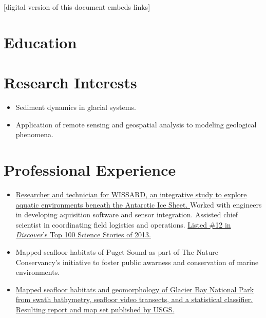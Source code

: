\documentclass{cv_TOH}
\begin{document}
\vspace{-0.2cm}
\centerline{\footnotesize{[digital version of this document embeds links]}}

\section{Education}

\section{Research Interests}
\begin{itemize}
\item Sediment dynamics in glacial systems.
\item Application of remote sensing and geospatial analysis to modeling geological phenomena.
\end{itemize}

\section{Professional Experience}

\begin{itemize}
\item \href{http://www.wissard.org}{Researcher and technician for WISSARD, an integrative study to explore aquatic environments beneath the Antarctic Ice Sheet. }Worked with engineers in developing aquisition software and sensor integration. Assisted chief scientist in coordinating field logistics and operations. \href{http://discovermagazine.com/2014/jan-feb/12-the-search-for-life-trapped-under-ice}{Listed \#12 in \textit{Discover}'s Top 100 Science Stories of 2013.}
\item Mapped seafloor habitats of Puget Sound as part of The Nature Conservancy's initiative to foster public awarness and conservation of marine environments.
\item \href{http://pubs.usgs.gov/sim/3253/}{Mapped seafloor habitats and geomorphology of Glacier Bay National Park from swath bathymetry, seafloor video transects, and a statistical classifier. Resulting report and map set published by USGS.}
\end{itemize}
\end{document}

